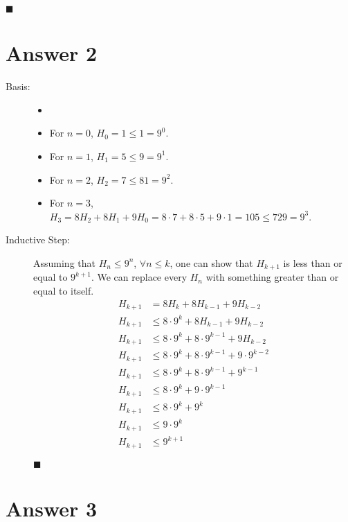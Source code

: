 \documentclass[12pt]{article}
\newcommand{\+}{\mkern2mu}
\newcommand{\uq}[1]{\forall #1}
\begin{document}
\begin{description}
    \hfill $\blacksquare$
\end{description}

\newpage

\section*{Answer 2}

\begin{description}
    \item[Basis:]
    \begin{itemize}
        \item[]
        \item For $n = 0$, $H_0 = 1 \leq 1 = 9^0$.
        \item For $n = 1$, $H_1 = 5 \leq 9 = 9^1$.
        \item For $n = 2$, $H_2 = 7 \leq 81 = 9^2$.
        \item For $n = 3$, $H_3 = 8H_2 + 8H_1 + 9H_0 = 8 \cdot 7 + 8 \cdot 5 + 9 \cdot 1 = 105 \leq 729 = 9^3$.
    \end{itemize}
    \item[Inductive Step:] Assuming that $H_n \leq 9^n$, $\uq{n} \leq k$, one can show that $H_{k+1}$ is less than or equal to $9^{k+1}$. We can replace every $H_n$ with something greater than or equal to itself.
    \begin{align*}
        H_{k+1} &= 8H_k + 8H_{k-1} + 9H_{k-2} \\
        H_{k+1} &\leq 8 \cdot 9^k + 8H_{k-1} + 9H_{k-2} \\
        H_{k+1} &\leq 8 \cdot 9^k + 8 \cdot 9^{k-1} + 9H_{k-2} \\
        H_{k+1} &\leq 8 \cdot 9^k + 8 \cdot 9^{k-1} + 9 \cdot 9^{k-2} \\
        H_{k+1} &\leq 8 \cdot 9^k + 8 \cdot 9^{k-1} + 9^{k-1} \\
        H_{k+1} &\leq 8 \cdot 9^k + 9 \cdot 9^{k-1} \\
        H_{k+1} &\leq 8 \cdot 9^k + 9^{k} \\
        H_{k+1} &\leq 9 \cdot 9^k \\
        H_{k+1} &\leq 9^{k+1}
    \end{align*}

    \hfill $\blacksquare$
\end{description}

\section*{Answer 3}
\end{document}
